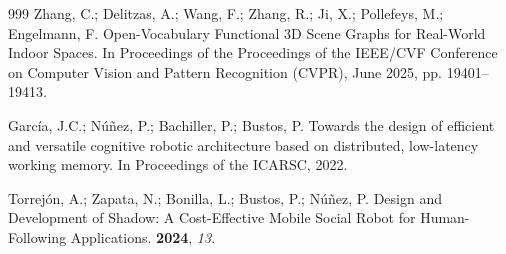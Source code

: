 \documentclass[10pt,a4paper]{article}
\begin{document}
\begin{thebibliography}{999}
Zhang, C.; Delitzas, A.; Wang, F.; Zhang, R.; Ji, X.; Pollefeys, M.; Engelmann,
  F.
\newblock Open-Vocabulary Functional 3D Scene Graphs for Real-World Indoor
  Spaces.
\newblock In Proceedings of the Proceedings of the IEEE/CVF Conference on
  Computer Vision and Pattern Recognition (CVPR),  June 2025, pp. 19401--19413.

García, J.C.; Núñez, P.; Bachiller, P.; Bustos, P.
\newblock Towards the design of efficient and versatile cognitive robotic
  architecture based on distributed, low-latency working memory.
\newblock In Proceedings of the ICARSC,  2022.

Torrejón, A.; Zapata, N.; Bonilla, L.; Bustos, P.; Núñez, P.
\newblock Design and Development of Shadow: A Cost-Effective Mobile Social
  Robot for Human-Following Applications.
 {\bf 2024}, {\em 13}.

\end{thebibliography}
 
\end{document}
